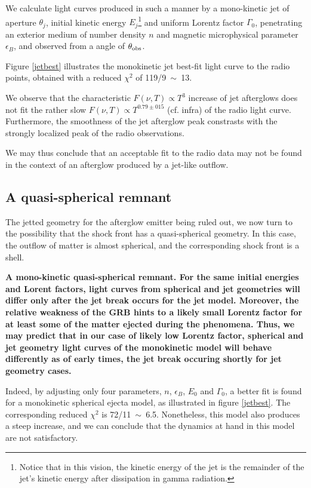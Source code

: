 We calculate light curves produced in such a manner by a mono-kinetic jet of aperture $\theta_j$, initial kinetic energy $E_j$\footnote{Notice that in this vision, the kinetic energy of the jet is the remainder of the jet's kinetic energy after dissipation in gamma radiation.} and uniform Lorentz factor $\Gamma_0$, penetrating an exterior medium of number density $n$ and magnetic microphysical parameter $\epsilon_B$, and observed from a angle of $\theta_{\rm{obs}}$.


Figure \ref{jetbest} illustrates the monokinetic jet best-fit light curve to the radio points, obtained with a reduced $\chi^2$ of 119/9~$\sim$~13. 

We observe that the characteristic $F(\nu, T) \propto T^3$ increase of jet afterglows does not fit the rather slow $F(\nu, T) \propto T^{0.79\pm015}$ (cf. infra) of the radio light curve. Furthermore, the smoothness of the jet afterglow peak constrasts with the strongly localized peak of the radio observations.

We may thus conclude that an acceptable fit to the radio data may not be found in the context of an afterglow produced by a jet-like outflow.


\subsection{A quasi-spherical remnant}

The jetted geometry for the afterglow emitter being ruled out, we now turn to the possibility that the shock front has a quasi-spherical geometry. In this case, the outflow of matter is almost spherical, and the corresponding shock front is a shell.

\bf{A mono-kinetic quasi-spherical remnant. }For the same initial energies and Lorent factors, light curves from spherical and jet geometries will differ only after the jet break occurs for the jet model. Moreover, the relative weakness of the GRB hints to a likely small Lorentz factor for at least some of the matter ejected during the phenomena. Thus, we may predict that in our case of likely low Lorentz factor, spherical and jet geometry light curves of the monokinetic model will behave differently as of early times, the jet break occuring shortly for jet geometry cases.

Indeed, by adjusting only four parameters, $n$, $\epsilon_B$, $E_0$ and $\Gamma_0$, a better fit is found for a monokinetic spherical ejecta model, as illustrated in figure \ref{jetbest}. The corresponding reduced $\chi^2$ is 72/11~$\sim$~6.5. Nonetheless, this model also produces a steep increase, and we can conclude that the dynamics at hand in this model are not satisfactory.

